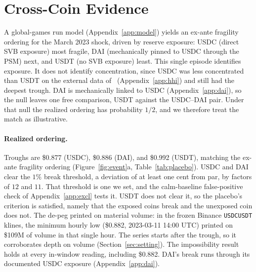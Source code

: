 \section{Cross-Coin Evidence}
\label{sec:placebo}

A global-games run model (Appendix~\ref{app:model}) yields an ex-ante fragility ordering
for the March 2023 shock, driven by reserve exposure: USDC (direct SVB exposure) most
fragile, DAI (mechanically pinned to USDC through the PSM) next, and USDT (no SVB
exposure) least. This single episode identifies exposure. It does not identify
concentration, since USDC was less concentrated than USDT on the external data
of~\cite{mzz2025} (Appendix~\ref{app:hhi}) and still had the deepest trough. DAI is
mechanically linked to USDC (Appendix~\ref{app:dai}), so the null leaves one free comparison,
USDT against the USDC--DAI pair. Under that null the realized ordering has probability $1/2$,
and we therefore treat the match as illustrative.

\begin{table}[t]
\centering
\caption{Cross-stablecoin placebo. ``De-peg'' and ``premium'' are the
maximum deviation below and above par over the 2023-03-08--17 UTC window, and USDT's
premium appears as two rows because it differs by feed and by time. Troughs are shown to
three figures and the basis-point columns are computed on the unrounded four-figure print,
so the two columns are consistent at full precision rather than at the precision shown.}
\label{tab:placebo}
\small
\checkwidth{\small}

\end{table}

\paragraph{Realized ordering.} Troughs are \$0.877 (USDC), \$0.886 (DAI), and \$0.992
(USDT), matching the ex-ante fragility ordering (Figure~\ref{fig:event}a,
Table~\ref{tab:placebo}). USDC and DAI clear the $1\%$ break threshold, a deviation of at
least one cent from par, by factors of $12$ and $11$. That threshold is one we set, and the calm-baseline false-positive check of Appendix~\ref{app:excl} tests
it. USDT does not clear it, so the placebo's
criterion is satisfied, namely that the exposed coins break and the unexposed coin does
not. The de-peg printed on material volume: in the frozen Binance
\texttt{USDCUSDT} klines, the minimum hourly low (\$0.882, 2023-03-11 14:00
UTC) printed on \$109M of volume in that single hour. The series starts after the trough,
so it corroborates depth on volume (Section~\ref{sec:setting}). The
impossibility result holds at every in-window reading, including \$0.882. DAI's break runs through
its documented USDC exposure (Appendix~\ref{app:dai}).

